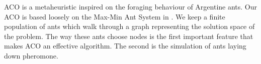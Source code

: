 ACO is a metaheuristic inspired on the foraging behaviour of Argentine ants. Our ACO is based loosely on the Max-Min Ant System in \cite{stutzle2000max}. We keep a finite population of ants which walk through a graph representing the solution space of the problem. The way these ants choose nodes is the first important feature that makes ACO an effective algorithm. The second is the simulation of ants laying down pheromone.
